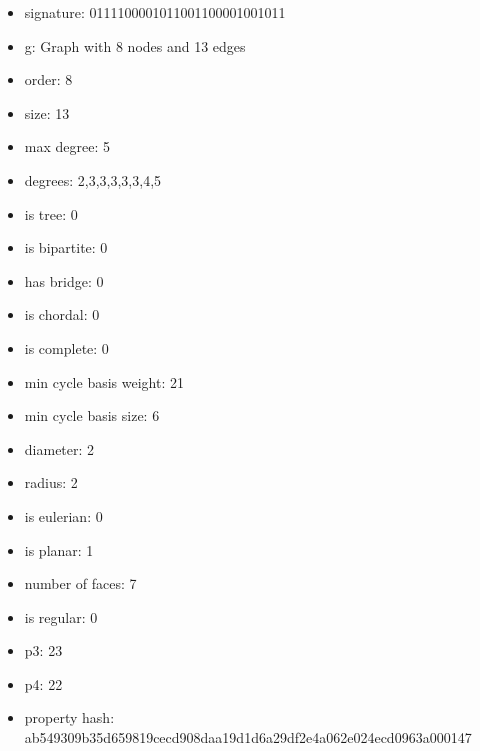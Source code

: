 \begin{itemize}
\item signature: 0111100001011001100001001011
\item g: Graph with 8 nodes and 13 edges
\item order: 8
\item size: 13
\item max degree: 5
\item degrees: 2,3,3,3,3,3,4,5
\item is tree: 0
\item is bipartite: 0
\item has bridge: 0
\item is chordal: 0
\item is complete: 0
\item min cycle basis weight: 21
\item min cycle basis size: 6
\item diameter: 2
\item radius: 2
\item is eulerian: 0
\item is planar: 1
\item number of faces: 7
\item is regular: 0
\item p3: 23
\item p4: 22
\item property hash: ab549309b35d659819cecd908daa19d1d6a29df2e4a062e024ecd0963a000147
\end{itemize}
\newpage
\begin{figure}
\end{figure}
